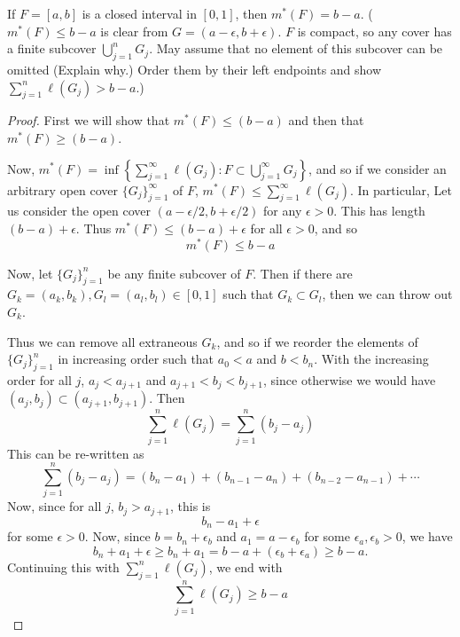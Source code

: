 \begin{pblm}%
	If $F = [a,b]$ is a closed interval in $[0,1]$, then $m^\ast(F)=b-a$. 
	($m^\ast(F) \le b - a$ is clear from $G = (a - \epsilon, b + \epsilon)$. 
	$F$ is compact, so any cover has a finite subcover $\bigcup\limits_{j=1}^n
	G_j$. May assume that no element of this subcover can be omitted (Explain 
	why.) Order them by their left endpoints and show $\sum\limits_{j=1}^n 
	\ell(G_j) > b - a.$)
\begin{proof}
	First we will show that $m^\ast(F) \le (b - a)$ and then that $m^\ast(F) \ge (b-a)$. 

	Now, $m^\ast(F) = \inf\left\{\sum\limits_{j=1}^\infty\ell(G_j):F\subset\bigcup\limits_{j=1}^\infty G_j\right\}$, and 
	so if we consider an arbitrary open cover $\{G_j\}_{j=1}^\infty$ of $F$, 
	$m^\ast(F) \le \sum\limits_{j=1}^\infty\ell(G_j)$. 
	In particular, Let us consider the open cover $(a - \epsilon / 2, b + \epsilon / 2)$ for 
	any $\epsilon > 0$. This has length $ (b - a) + \epsilon$. Thus 
	$m^\ast(F) \le (b - a) + \epsilon$ for all $\epsilon > 0$, and so 
	\begin{equation*}
		m^\ast(F) \le b - a
	\end{equation*}

	Now, let $\{G_j\}_{j = 1}^n$ be any finite subcover of $F$. Then if there are 
	$G_k = (a_k, b_k), G_l = (a_l, b_l) \in [0,1]$ such that $G_k \subset G_l$, 
	then we can throw out $G_k$. 

	Thus we can remove all extraneous $G_k$, and so if we reorder the elements 
	of $\{G_j\}_{j=1}^n$ in increasing order such that $a_0 < a $ and $b < b_n$. 
	With the increasing order for all $j$, $a_j < a_{j+1}$ and 
	$a_{j+1} < b_j < b_{j+1}$, since otherwise we would have 
	$(a_j,b_j) \subset (a_{j+1},b_{j+1})$. Then
	\begin{equation*}
		\sum\limits_{j=1}^n\ell(G_j) = \sum\limits_{j=1}^n (b_j-a_j)
	\end{equation*}
	This can be re-written as 
	\begin{equation*}
		\sum\limits_{j=1}^n(b_j-a_j) = (b_n - a_1) + (b_{n-1} - a_n) + (b_{n-2} - a_{n-1}) + \cdots
	\end{equation*}
	Now, since for all $j$, $b_j > a_{j+1}$, this is 
	\begin{equation*}
		b_n - a_1 + \epsilon
	\end{equation*}
	for some $\epsilon > 0$. Now, since $b = b_n + \epsilon_b$ and 
	$a_1 = a - \epsilon_b$ for some $\epsilon_a, \epsilon_b  > 0$, 
	we have 
	\begin{equation*}
		b_n + a_1 + \epsilon \ge b_n + a_1 = b - a + (\epsilon_b + \epsilon_a) \ge b - a. 
	\end{equation*}
	Continuing this with $\sum\limits_{j=1}^n\ell(G_j)$, we end with 
	\begin{equation*}
		\sum\limits_{j=1}^n \ell(G_j) \ge b - a
	\end{equation*}


\end{proof}
\end{pblm}
